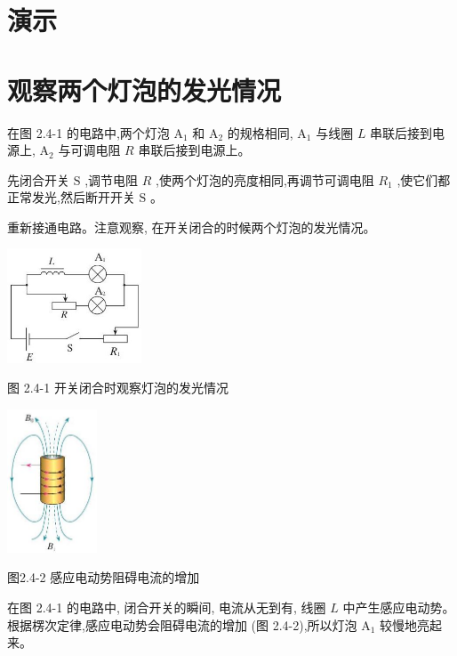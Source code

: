 \documentclass[10pt]{article}
\begin{document}
\section*{演示}

\section*{观察两个灯泡的发光情况}

在图 2.4-1 的电路中,两个灯泡 \({\mathrm{A}}_{1}\) 和 \({\mathrm{A}}_{2}\) 的规格相同, \({\mathrm{A}}_{1}\) 与线圈 \(L\) 串联后接到电源上, \({\mathrm{A}}_{2}\) 与可调电阻 \(R\) 串联后接到电源上。

先闭合开关 \(\mathrm{S}\) ,调节电阻 \(R\) ,使两个灯泡的亮度相同,再调节可调电阻 \({R}_{1}\) ,使它们都正常发光,然后断开开关 \(\mathrm{S}\) 。

重新接通电路。注意观察, 在开关闭合的时候两个灯泡的发光情况。

\begin{center}
\includegraphics[max width=0.3\textwidth]{images/01910e72-c5b7-7ed5-a6d4-fb3a5faefc32_46_661405.jpg}
\end{center}

图 2.4-1 开关闭合时观察灯泡的发光情况

\begin{center}
\includegraphics[max width=0.2\textwidth]{images/01910e72-c5b7-7ed5-a6d4-fb3a5faefc32_46_715610.jpg}
\end{center}

图2.4-2 感应电动势阻碍电流的增加

在图 2.4-1 的电路中, 闭合开关的瞬间, 电流从无到有, 线圈 \(L\) 中产生感应电动势。根据楞次定律,感应电动势会阻碍电流的增加 (图 2.4-2),所以灯泡 \({\mathrm{A}}_{1}\) 较慢地亮起来。
\end{document}
